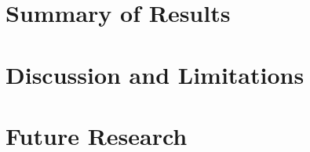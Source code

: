 
\section{Summary of Results}
\label{s:conclusions-summary}


\section{Discussion and Limitations}
\label{s:conclusions-discussion}

\section{Future Research}
\label{s:conclusions-future}

